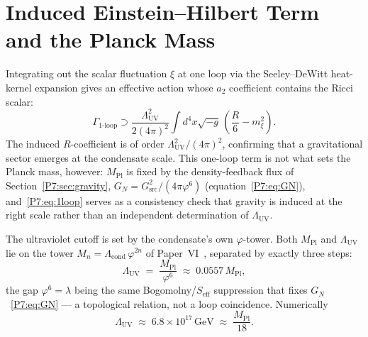 \documentclass[11pt,a4paper]{article}
\theoremstyle{definition}
\theoremstyle{remark}
\newcommand{\vp}{\varphi}
\newcommand{\Lcond}{\Lambda_{\mathrm{cond}}}
\newcommand{\MPl}{M_{\mathrm{Pl}}}
\newcommand{\LUV}{\Lambda_{\mathrm{UV}}}
\begin{document}
\section{Induced Einstein--Hilbert Term and the Planck Mass}
\label{P7:sec:gravity_loop}

Integrating out the scalar fluctuation $\xi$ at one loop via the
Seeley--DeWitt heat-kernel expansion gives an effective action whose
$a_2$ coefficient contains the Ricci scalar:
\begin{equation}
  \Gamma_{1\text{-loop}} \supset
  \frac{\LUV^2}{2(4\pi)^2}\int d^4x\sqrt{-g}\,
  \left(\frac{R}{6} - m_\xi^2\right).
  \label{P7:eq:1loop}
\end{equation}
The induced $R$-coefficient is of order $\LUV^2/(4\pi)^2$, confirming that a
gravitational sector emerges at the condensate scale.  This one-loop term is
not what sets the Planck mass, however: $\MPl$ is fixed by the density-feedback
flux of Section~\ref{P7:sec:gravity}, $G_N=G_{\mathrm{src}}^2/(4\pi\vp^6)$
(equation~\eqref{P7:eq:GN}), and~\eqref{P7:eq:1loop} serves as a consistency
check that gravity is induced at the right scale rather than an independent
determination of $\LUV$.

The ultraviolet cutoff is set by the condensate's own $\vp$-tower.  Both $\MPl$
and $\LUV$ lie on the tower $M_n=\Lcond\,\vp^{2n}$ of Paper~VI~\cite{Paper6},
separated by exactly three steps:
\begin{equation}
  \boxed{\LUV \;=\; \frac{\MPl}{\vp^6}\;\approx\;0.0557\,\MPl,}
  \label{P7:eq:MPl}
\end{equation}
the gap $\vp^6=\lambda$ being the same Bogomolny/$S_{\mathrm{eff}}$ suppression
that fixes $G_N$~\eqref{P7:eq:GN} --- a topological relation, not a loop
coincidence.  Numerically
\begin{equation}
  \LUV \;\approx\; 6.8\times10^{17}\,\mathrm{GeV}\;\approx\;\frac{\MPl}{18}.
  \label{P7:eq:LUV_approx}
\end{equation}
\end{document}
